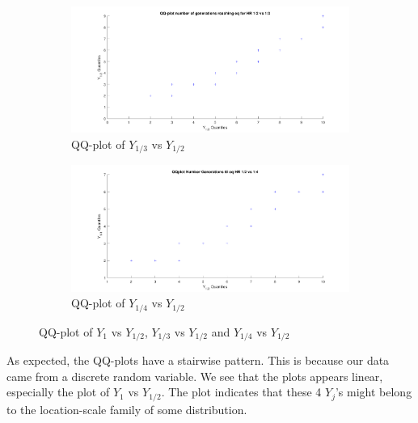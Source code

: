 \begin{figure}[H]
    \begin{subfigure}{0.8\textwidth}
    \includegraphics[width=\textwidth]{QQplotATGEN1.pdf}
    \caption{QQ-plot of $Y_{1/3}$ vs $Y_{1/2}$}
        \label{fig:QQplotATGEN1}
    \end{subfigure}
    \begin{subfigure}{0.8\textwidth}
    \includegraphics[width=\textwidth]{QQplotATGEN2.pdf}
    \caption{QQ-plot of $Y_{1/4}$ vs $Y_{1/2}$}
        \label{fig:QQplotATGEN2}
    \end{subfigure}
    \caption{QQ-plot of $Y_{1}$ vs $Y_{1/2}$, $Y_{1/3}$ vs $Y_{1/2}$ and $Y_{1/4}$ vs $Y_{1/2}$}
    \label{fig:QQ-plot}
\end{figure}

As expected, the QQ-plots have a stairwise pattern. This is because our data came from a discrete random variable. We see that the plots appears linear, especially the plot of $Y_{1}$ vs $Y_{1/2}$. The plot indicates that these 4 $Y_j$'s might belong to the location-scale family of some distribution.\\

